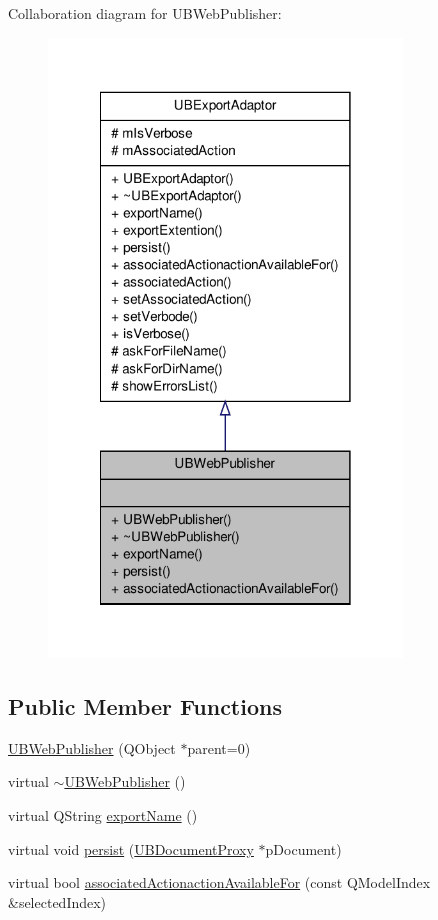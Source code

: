 Collaboration diagram for U\-B\-Web\-Publisher\-:
\nopagebreak
\begin{figure}[H]
\begin{center}
\leavevmode
\includegraphics[width=266pt]{d2/d5a/class_u_b_web_publisher__coll__graph}
\end{center}
\end{figure}
\subsection*{Public Member Functions}
\begin{DoxyCompactItemize}
\item 
\hyperlink{class_u_b_web_publisher_adb1a0323fc087d105992602ab79be1bc}{U\-B\-Web\-Publisher} (Q\-Object $\ast$parent=0)
\item 
virtual \hyperlink{class_u_b_web_publisher_a006f12db51bde15ffb9f0374ee209e41}{$\sim$\-U\-B\-Web\-Publisher} ()
\item 
virtual Q\-String \hyperlink{class_u_b_web_publisher_aa9690c4b0871eedf5ec835b56b381913}{export\-Name} ()
\item 
virtual void \hyperlink{class_u_b_web_publisher_acf1964056e5008ca164f974cc55e8b24}{persist} (\hyperlink{class_u_b_document_proxy}{U\-B\-Document\-Proxy} $\ast$p\-Document)
\item 
virtual bool \hyperlink{class_u_b_web_publisher_aadf6fda2572e6bc4aeb54f5bf8c248f5}{associated\-Actionaction\-Available\-For} (const Q\-Model\-Index \&selected\-Index)
\end{DoxyCompactItemize}
